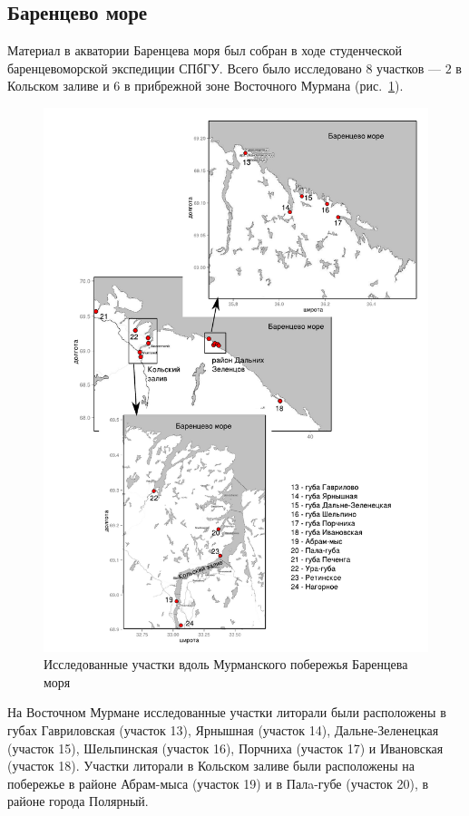 		\subsection{Баренцево море}
Материал  в акватории Баренцева моря  был  собран    в ходе   студенческой баренцевоморской экспедиции СПбГУ. 
Всего было исследовано $8$ участков --- $2$ в Кольском заливе и   $6$  в   прибрежной   зоне  Восточного  Мурмана (рис.~\ref{ris:karta_Barents}).  
	\begin{figure}[p]
    \includegraphics[width=\textwidth]{../maps/Barents_sea1.pdf}
    \caption{Исследованные участки вдоль Мурманского побережья Баренцева моря}
    \label{ris:karta_Barents}
	\end{figure}
На   Восточном   Мурмане исследованные участки литорали  были   расположены   в   губах   Гавриловская (участок 13),  Ярнышная (участок 14), Дальне-Зеленецкая (участок 15), Шельпинская (участок 16), Порчниха (участок 17) и Ивановская (участок 18).
Участки литорали  в   Кольском   заливе   были  расположены на побережье в районе Абрам-мыса (участок 19) и в Палa-губе (участок 20), в районе города Полярный. 



